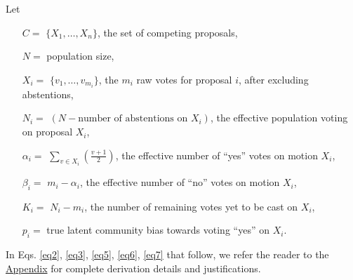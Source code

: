 \documentclass[chi_draft]{sigchi}
\begin{document}
Let
\begin{description}
\begin{itemize}
\item[$C = $] $\{X_1,\ldots, X_n\}$, the set of competing proposals,
\item[$N = $] population size,
\item[$X_i = $] $\{v_1, \ldots, v_{m_i}\}$, the $m_i$ raw votes for proposal $i$, after excluding abstentions,
\item[$N_i = $] $(N - \textrm{number of abstentions on } X_i)$, the effective population voting on proposal $X_i$,
\item[$\alpha_i = $] $\sum\limits_{v \in X_i}\left(\frac{v+1}{2}\right)$, the effective number of ``yes'' votes on motion $X_i$,
\item[$\beta_i = $] $m_i - \alpha_i$, the effective number of ``no'' votes on motion $X_i$,
\item[$K_i = $] $N_i - m_i$, the number of remaining votes yet to be cast on $X_i$,
\item[$p_i = $] true latent community bias towards voting ``yes'' on $X_i$.
\end{itemize}
\end{description}

In Eqs. \eqref{eq2}, \eqref{eq3}, \eqref{eq5}, \eqref{eq6}, \eqref{eq7} that follow, we refer the reader to the \hyperref[sec:derivation]{Appendix} for complete derivation details and justifications.
\end{document}
